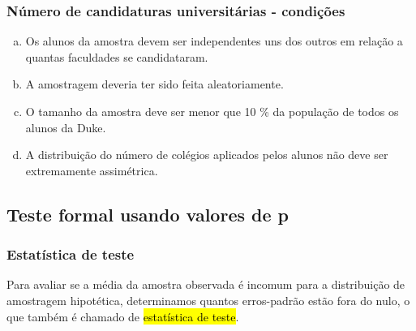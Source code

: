 \documentclass[11pt]{beamer}
\begin{document}
\begin{frame}
\frametitle{Número de candidaturas universitárias - condições}


\begin{enumerate}[(a)]
\item Os alunos da amostra devem ser independentes uns dos outros em relação a quantas faculdades se candidataram.
\item A amostragem deveria ter sido feita aleatoriamente.
\item O tamanho da amostra deve ser menor que 10 \% da população de todos os alunos da Duke.
\item A distribuição do número de colégios aplicados pelos alunos não deve ser extremamente assimétrica.
\end{enumerate}

\end{frame}


\subsection{Teste formal usando valores de p}


\begin{frame}
\frametitle{Estatística de teste}

Para avaliar se a média da amostra observada é incomum para a distribuição de amostragem hipotética, determinamos quantos erros-padrão estão fora do nulo, o que também é chamado de \hl{estatística de teste}.


\pause

{
\pause
{}
\pause
{}
}

\end{frame}
\end{document}
